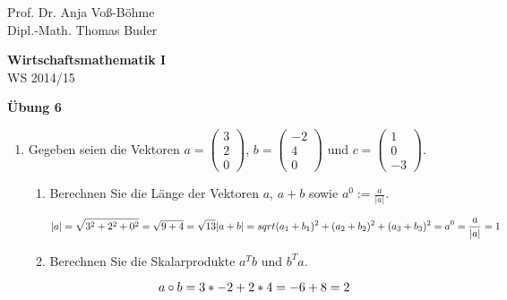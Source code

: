 \documentclass[12pt,a4paper]{scrreprt}
\begin{document}
 
\begin{flushleft}
Prof. Dr.  Anja Voß-Böhme \\
Dipl.-Math. Thomas Buder
\end{flushleft}

\begin{center}
{ \large\bf Wirtschaftsmathematik I} \\
WS 2014/15 \end{center}

\begin{center}{\large\bf Übung 6 } 
\end{center}


\bigskip
\begin{enumerate}
	\item	Gegeben seien die Vektoren
		$a=\begin{pmatrix}
			3 \\
			2\\
			0
		\end{pmatrix}$,
        $b=\begin{pmatrix}
			-2 \\
			4\\
			0
		\end{pmatrix}$ und
        $c=\begin{pmatrix}
			1 \\
			0\\
			-3
		\end{pmatrix}.$
	\begin{enumerate}
		\item Berechnen Sie die Länge der Vektoren $a$, $a+b$ sowie $a^0:=\frac{a}{|a|}$.
        
        \begin{equation}
        	|a| = \sqrt{3^2+2^2+0^2} = \sqrt{9+4} = \sqrt{13} \\
    	    |a+b| = sqrt{(a_1+b_1)^2+(a_2+b_2)^2+(a_3+b_3)^2} =  \\
	        a^0=\frac{a}{|a|}=1 \\
        \end{equation}
        
\item Berechnen Sie die Skalarprodukte $a^Tb$ und  $b^Ta$.

        \begin{equation}
a \circ b = 3*-2+2*4 = -6+8 = 2 \\


\end{equation}
\end{enumerate}
\end{enumerate}
\end{document}
